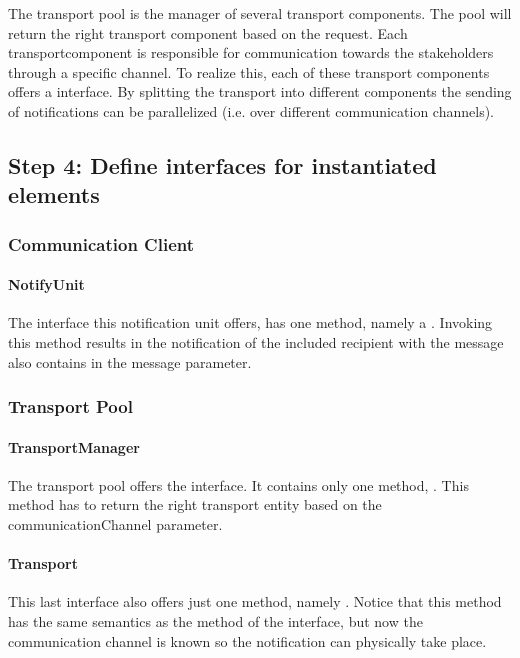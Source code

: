 \npar The transport pool is the manager of several transport components. The
pool will return the right transport component based on the request. Each
transportcomponent is responsible for communication towards the stakeholders
through a specific channel. To realize this, each of these transport components
offers a  interface. By splitting the transport into different
components the sending of notifications can be parallelized (i.e. over
different communication channels).

\subsection{Step 4: Define interfaces for instantiated elements}
\label{add:it8/interfaces}

\subsubsection{Communication Client}

\paragraph{NotifyUnit}

\npar The interface this notification unit offers, has one method, namely a
. Invoking this method results in the notification of
the included recipient with the message also contains in the message parameter.

\subsubsection{Transport Pool}

\paragraph{TransportManager}

\npar The transport pool offers the  interface. It
contains only one method, . This method has to return the right transport entity based on the
communicationChannel parameter.

\paragraph{Transport}

\npar This last interface also offers just one method, namely
. Notice that this method has the same semantics as
the method of the  interface, but now the communication
channel is known so the notification can physically take place.

